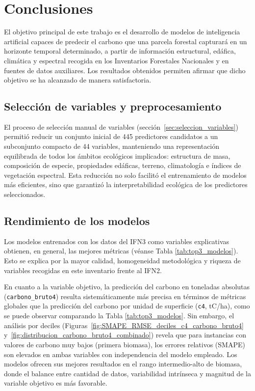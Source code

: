 \section{Conclusiones}
\label{sec:conclusiones}

El objetivo principal de este trabajo es el desarrollo de modelos de inteligencia artificial capaces de predecir el carbono que una parcela forestal capturará en un horizonte temporal determinado, a partir de información estructural, edáfica, climática y espectral recogida en los Inventarios Forestales Nacionales y en fuentes de datos auxiliares. Los resultados obtenidos permiten afirmar que dicho objetivo se ha alcanzado de manera satisfactoria.

\subsection*{Selección de variables y preprocesamiento}

El proceso de selección manual de variables (sección~\ref{sec:seleccion_variables}) permitió reducir un conjunto inicial de 445 predictores candidatos a un subconjunto compacto de 44 variables, manteniendo una representación equilibrada de todos los ámbitos ecológicos implicados: estructura de masa, composición de especie, propiedades edáficas, terreno, climatología e índices de vegetación espectral. Esta reducción no solo facilitó el entrenamiento de modelos más eficientes, sino que garantizó la interpretabilidad ecológica de los predictores seleccionados.

\subsection*{Rendimiento de los modelos}

Los modelos entrenados con los datos del IFN3 como variables explicativas obtienen, en general, las mejores métricas (véanse Tabla \ref{tab:top3_modelos}). Esto se explica por la mayor calidad, homogeneidad metodológica y riqueza de variables recogidas en este inventario frente al IFN2.

En cuanto a la variable objetivo, la predicción del carbono en toneladas absolutas (\texttt{carbono\_bruto4}) resulta sistemáticamente más precisa en términos de métricas globales que la predicción del carbono por unidad de superficie (\texttt{c4}, tC/ha), como se puede observar comparando la Tabla \ref{tab:top3_modelos}. Sin embargo, el análisis por deciles (Figuras~\ref{fig:SMAPE_RMSE_deciles_c4_carbono_bruto4} y~\ref{fig:distribucion_carbono_bruto4_combinado}) revela que para instancias con valores de carbono muy bajos (primera biomasa), los errores relativos (SMAPE) son elevados en ambas variables con independencia del modelo empleado. Los modelos ofrecen sus mejores resultados en el rango intermedio-alto de biomasa, donde el balance entre cantidad de datos, variabilidad intrínseca y magnitud de la variable objetivo es más favorable.

